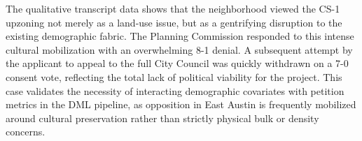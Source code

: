 The qualitative transcript data shows that the neighborhood viewed the CS-1 upzoning not merely as a land-use issue, but as a gentrifying disruption to the existing demographic fabric. The Planning Commission responded to this intense cultural mobilization with an overwhelming 8-1 denial. A subsequent attempt by the applicant to appeal to the full City Council was quickly withdrawn on a 7-0 consent vote, reflecting the total lack of political viability for the project. This case validates the necessity of interacting demographic covariates with petition metrics in the DML pipeline, as opposition in East Austin is frequently mobilized around cultural preservation rather than strictly physical bulk or density concerns.
